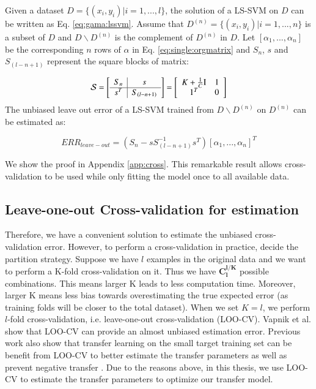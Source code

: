 \begin{theorem}\label{th:single:cv}
	Given a dataset $D=\{(x_i,y_i)|i=1,...,l\}$, the solution of a LS-SVM on $D$ can be written as Eq. \eqref{eq:gama:lssvm}.
	Assume that $D^{(n)} = \{(x_i,y_i)|i=1,...,n\}$ is a subset of $D$ and $D\backslash D^{(n)}$ is the complement of $D^{(n)}$ in $D$. 
	Let $\left[\alpha_1,...,\alpha_n\right]$ be the corresponding $n$ rows of $\alpha$ in Eq. \eqref{eq:single:orgmatrix} and $S_n$, $s$ and $S_{(l - n + 1)}$ represent the square blocks of matrix:
	
	\begin{equation}\label{eq:single:kernel}
	\mathcal{S}=\left[ {\begin{array}{c|c}
		{{S_{n }}} &s\\ \hline
		{{s^T}}&{{S_{(l - n + 1)}}}
		\end{array}} \right] =\left[ {\begin{array}{*{20}{c}}
		{K  + \frac{1}{C}{\rm I}}\\
		1^T
		\end{array}\begin{array}{*{20}{c}}
		1\\
		0
		\end{array}} \right]
	\end{equation}
	The unbiased leave out error of a LS-SVM trained from $D\backslash D^{(n)}$ on $D^{(n)}$ can be estimated as:
	
	\begin{equation*}\label{eq:single:nout}
	ERR_{leave-out} = \left( {{S_n} - sS_{(l - n + 1)}^{ - 1}{s^T}} \right){\left[ {{\alpha _1},...,{\alpha _n}} \right]^T}
	\end{equation*}
\end{theorem}
We show the proof in Appendix \ref{app:cross}. This remarkable result allows cross-validation to be used while only fitting the model once to all available data.

\subsection{Leave-one-out Cross-validation for estimation}
Therefore, we have a convenient solution to estimate the unbiased cross-validation error. However, to perform a cross-validation in practice, decide the partition strategy. Suppose we have $l$ examples in the original data and we want to perform a K-fold cross-validation on it. Thus we have $\mathbf{C^{l/K}_l}$ possible combinations. This means larger K leads to less computation time. Moreover, larger K means less bias towards overestimating the true expected error (as training folds will be closer to the total dataset). When we set $K=l$, we perform $l$-fold cross-validation, i.e. leave-one-out cross-validation (LOO-CV). Vapnik et al. \cite{vapnik2000bounds} show that LOO-CV can provide an almost unbiased estimation error. Previous work also show that transfer learning on the small target training set can be benefit from LOO-CV to better estimate the transfer parameters as well as prevent negative transfer \cite{kuzborskij2013stability}. Due to the reasons above, in this thesis, we use LOO-CV to estimate the transfer parameters to optimize our transfer model.


